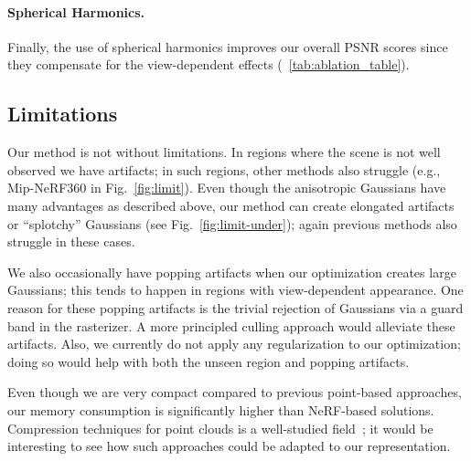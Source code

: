 \paragraph{Spherical Harmonics.}
Finally, the use of spherical harmonics improves our overall PSNR scores since they compensate for the view-dependent effects (~\ref{tab:ablation_table}).




\subsection{Limitations}

Our method is not without limitations.
In regions where the scene is not well observed we have artifacts; in such regions, other methods also struggle (e.g., Mip-NeRF360 in Fig.~\ref{fig:limit}).
Even though the anisotropic Gaussians have many advantages as described above,
our method can create elongated artifacts or ``splotchy'' Gaussians (see Fig.~\ref{fig:limit-under}); again previous methods also struggle in these cases.

We also occasionally have popping artifacts when our optimization creates large Gaussians; this tends to happen in regions with view-dependent appearance. %
One reason for these popping artifacts is the trivial rejection of Gaussians via a guard band in the rasterizer. A more principled culling approach would alleviate these artifacts. 
Also, we currently do not apply any regularization to our optimization; doing so would help with both the unseen region and popping artifacts.


Even though we are very compact compared to previous point-based approaches, our memory consumption is significantly higher than NeRF-based solutions.  Compression techniques for point clouds is a well-studied field~\cite{de2016compression}; it would be interesting to see how such approaches could be adapted to our representation.



